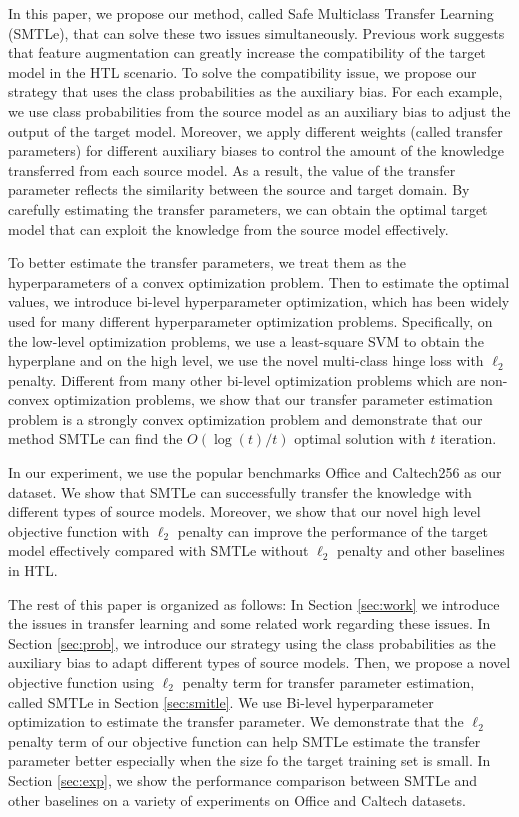 In this paper, we propose our method, {called Safe Multiclass Transfer Learning (SMTLe)}, that can solve these two issues simultaneously. Previous work \cite{jie2011multiclass} suggests that feature augmentation can greatly increase the compatibility of the target model in the HTL scenario. To solve the compatibility issue, we propose our strategy that uses the class probabilities as the auxiliary bias. For each example, we use class probabilities from the source model as an auxiliary bias to adjust the output of the target model. Moreover, we apply different weights (called transfer parameters) for different auxiliary biases to control the amount of the knowledge transferred from each source model. As a result, the value of the transfer parameter reflects the similarity between the source and target domain. By carefully estimating the transfer parameters, we can obtain the optimal target model that can exploit the knowledge from the source model effectively.

To better estimate the transfer parameters, we treat them as the hyperparameters of a convex optimization problem. Then to estimate the optimal values, we introduce bi-level hyperparameter optimization\cite{Pedregosa16}, which has been widely used for many different hyperparameter optimization problems. Specifically, on the low-level optimization problems, we use a least-square SVM to obtain the hyperplane and on the high level, we use the novel multi-class hinge loss with $\ell_2$ penalty. Different from many other bi-level optimization problems which are non-convex optimization problems, we show that our transfer parameter estimation problem is a strongly convex optimization problem and demonstrate that our method SMTLe can find the $O({\log(t)}/{t})$ optimal solution with $t$ iteration. 

In our experiment, we use the popular benchmarks Office and Caltech256 as our dataset. We show that SMTLe can successfully transfer the knowledge with different types of source models. Moreover, we show that our novel high level objective function with $\ell_2$ penalty can improve the performance of the target model effectively compared with SMTLe without $\ell_2$ penalty and other baselines in HTL. 

The rest of this paper is organized as follows: In Section \ref{sec:work} we introduce the issues in transfer learning and some related work regarding these issues.
In Section \ref{sec:prob}, we introduce our strategy using the class probabilities as the auxiliary bias to adapt different types of source models.
Then, we propose a novel objective function using $\ell_2$ penalty term for transfer parameter estimation, called SMTLe in Section \ref{sec:smitle}. We use Bi-level hyperparameter optimization to estimate the transfer parameter. We demonstrate that the $\ell_2$ penalty term of our objective function can help SMTLe estimate the transfer parameter better especially when the size fo the target training set is small.
In Section \ref{sec:exp}, we show the performance comparison between SMTLe and other baselines on a variety of experiments on Office and Caltech datasets.
